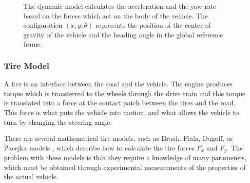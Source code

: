 \begin{figure}[h!]
	
	\caption{The dynamic model calculates the acceleration and the yaw rate based on the forces which act on the body of the vehicle. The configuration $(x, y, \theta)$ represents the position of the center of gravity of the vehicle and the heading angle in the global reference frame.}
	\label{fig:dynamic_bicycle}
\end{figure}

\subsubsection{Tire Model}

A tire is an interface between the road and the vehicle. The engine produces torque which is transferred to the wheels through the drive train and this torque is translated into a force at the contact patch between the tires and the road. This force is what puts the vehicle into motion, and what allows the vehicle to turn by changing the steering angle. 

There are several mathematical tire models, such as Brush, Fiala, Dugoff, or Pacejka models \cite{rajamani, pacejka}, which describe how to calculate the tire forces $F_x$ and $F_y$. The problem with these models is that they require a knowledge of many parameters, which must be obtained through experimental measurements of the properties of the actual vehicle.

